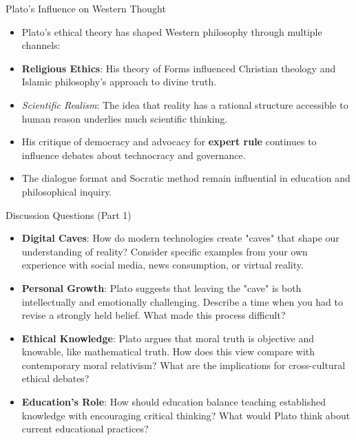 \documentclass[aspectratio=169]{beamer}
\begin{document}
\begin{frame}{Plato's Influence on Western Thought}
\begin{itemize}
\item Plato's ethical theory has shaped Western philosophy through multiple channels:
\item \textbf{Religious Ethics}: His theory of Forms influenced Christian theology and Islamic philosophy's approach to divine truth.
\item \emph{Scientific Realism}: The idea that reality has a rational structure accessible to human reason underlies much scientific thinking.
\item His critique of democracy and advocacy for \textbf{expert rule} continues to influence debates about technocracy and governance.
\item The dialogue format and Socratic method remain influential in education and philosophical inquiry.
\end{itemize}
\end{frame}

\begin{frame}{Discussion Questions (Part 1)}
\begin{itemize}
\item \textbf{Digital Caves}: How do modern technologies create "caves" that shape our understanding of reality? Consider specific examples from your own experience with social media, news consumption, or virtual reality.

\item \textbf{Personal Growth}: Plato suggests that leaving the "cave" is both intellectually and emotionally challenging. Describe a time when you had to revise a strongly held belief. What made this process difficult?

\item \textbf{Ethical Knowledge}: Plato argues that moral truth is objective and knowable, like mathematical truth. How does this view compare with contemporary moral relativism? What are the implications for cross-cultural ethical debates?

\item \textbf{Education's Role}: How should education balance teaching established knowledge with encouraging critical thinking? What would Plato think about current educational practices?
\end{itemize}
\end{frame}
\end{document}

